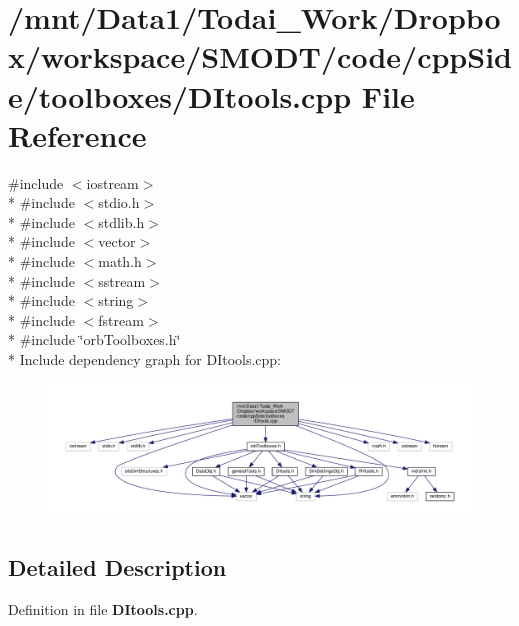 \section{/mnt/\-Data1/\-Todai\-\_\-\-Work/\-Dropbox/workspace/\-S\-M\-O\-D\-T/code/cpp\-Side/toolboxes/\-D\-Itools.cpp File Reference}
\label{_d_itools_8cpp}
{\ttfamily \#include $<$iostream$>$}\\*
{\ttfamily \#include $<$stdio.\-h$>$}\\*
{\ttfamily \#include $<$stdlib.\-h$>$}\\*
{\ttfamily \#include $<$vector$>$}\\*
{\ttfamily \#include $<$math.\-h$>$}\\*
{\ttfamily \#include $<$sstream$>$}\\*
{\ttfamily \#include $<$string$>$}\\*
{\ttfamily \#include $<$fstream$>$}\\*
{\ttfamily \#include \char`\"{}orb\-Toolboxes.\-h\char`\"{}}\\*
Include dependency graph for D\-Itools.\-cpp\-:\nopagebreak
\begin{figure}[H]
\begin{center}
\leavevmode
\includegraphics[width=350pt]{_d_itools_8cpp__incl}
\end{center}
\end{figure}


\subsection{Detailed Description}


Definition in file {\bf D\-Itools.\-cpp}.

